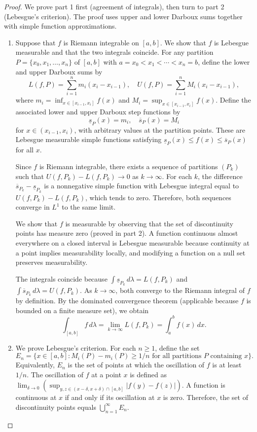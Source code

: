 \begin{proof}
We prove part 1 first (agreement of integrals), then turn to part 2 (Lebesgue's criterion). The proof uses upper and lower Darboux sums together with simple function approximations.

\begin{enumerate}
    \item Suppose that $f$ is Riemann integrable on $[a,b]$. We show that $f$ is Lebesgue measurable and that the two integrals coincide. For any partition $P = \{x_0, x_1, \dots, x_n\}$ of $[a,b]$ with $a = x_0 < x_1 < \cdots < x_n = b$, define the lower and upper Darboux sums by
    $$L(f,P) = \sum_{i=1}^n m_i (x_i - x_{i-1}), \quad U(f,P) = \sum_{i=1}^n M_i (x_i - x_{i-1}),$$
    where $m_i = \inf_{x \in [x_{i-1}, x_i]} f(x)$ and $M_i = \sup_{x \in [x_{i-1}, x_i]} f(x)$. Define the associated lower and upper Darboux step functions by
    $$\underline{s}_P(x) = m_i, \quad \overline{s}_P(x) = M_i$$
    for $x \in (x_{i-1}, x_i)$, with arbitrary values at the partition points. These are Lebesgue measurable simple functions satisfying $\underline{s}_P(x) \leq f(x) \leq \overline{s}_P(x)$ for all $x$.

    Since $f$ is Riemann integrable, there exists a sequence of partitions $(P_k)$ such that $U(f,P_k) - L(f,P_k) \to 0$ as $k \to \infty$. For each $k$, the difference $\overline{s}_{P_k} - \underline{s}_{P_k}$ is a nonnegative simple function with Lebesgue integral equal to $U(f,P_k) - L(f,P_k)$, which tends to zero. Therefore, both sequences converge in $L^1$ to the same limit.

    We show that $f$ is measurable by observing that the set of discontinuity points has measure zero (proved in part 2). A function continuous almost everywhere on a closed interval is Lebesgue measurable because continuity at a point implies measurability locally, and modifying a function on a null set preserves measurability.

    The integrals coincide because $\int \underline{s}_{P_k}\,d\lambda = L(f,P_k)$ and $\int \overline{s}_{P_k}\,d\lambda = U(f,P_k)$. As $k \to \infty$, both converge to the Riemann integral of $f$ by definition. By the dominated convergence theorem (applicable because $f$ is bounded on a finite measure set), we obtain
    $$\int_{[a,b]} f\,d\lambda = \lim_{k \to \infty} L(f,P_k) = \int_a^b f(x)\,dx.$$

    \item We prove Lebesgue's criterion. For each $n \geq 1$, define the set
    $$E_n = \{x \in [a,b] : M_i(P) - m_i(P) \geq 1/n \text{ for all partitions } P \text{ containing } x\}.$$
    Equivalently, $E_n$ is the set of points at which the oscillation of $f$ is at least $1/n$. The oscillation of $f$ at a point $x$ is defined as $\lim_{\delta \to 0} (\sup_{y,z \in (x-\delta,x+\delta)\cap[a,b]} |f(y) - f(z)|)$. A function is continuous at $x$ if and only if its oscillation at $x$ is zero. Therefore, the set of discontinuity points equals $\bigcup_{n=1}^\infty E_n$.


\end{enumerate}
\end{proof}
